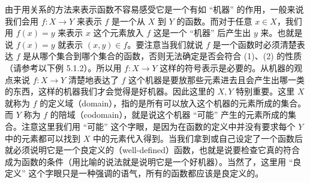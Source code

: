 由于用关系的方法来表示函数不容易感受它是一个有如 “机器” 的作用，一般来说我们会用 $f : X \to Y$ 来表示 $f$ 是一个从 $X$ 到 $Y$ 的函数。而对于任意 $x \in X$，我们用 $f(x) = y$ 来表示 $x$ 这个元素放入 $f$ 这是一个 “机器” 后产生出 $y$ 来。也就是说 $f(x) = y$ 就表示 $(x, y) \in f$。要注意当我们就说 $f$ 是一个函数时必须清楚表达 $f$ 是从哪个集合到哪个集合的函数，否则无法确定是否会符合 (1)、(2) 的性质（请参考以下例 5.1.2）。所以用 $f : X \to Y$ 这样的符号表示是必要的。从机器的观点来说 $f : X \to Y$ 清楚地表达了 $f$ 这个机器是要放那些元素进去且会产生出哪一类的东西，这样的机器我们才会觉得是好机器。因此这里的 $X, Y$ 特别重要。这里 $X$ 就称为 $f$ 的定义域（domain），指的是所有可以放入这个机器的元素所成的集合。而 $Y$ 称为 $f$ 的陪域（codomain），就是说这个机器 “可能” 产生的元素所成的集合。注意这里我们用 “可能” 这个字眼，是因为在函数的定义中并没有要求每个 $Y$ 中的元素都可以找到 $X$ 中的元素代入得到。当我们拿到或自己设定了一个函数后就必须说明它是一个良定义的（well-defined）函数，也就是说要检查它真的符合成为函数的条件（用比喻的说法就是说明它是一个好机器）。当然了，这里用 “良定义” 这个字眼只是一种强调的语气，所有的函数都应该是良定义的。

